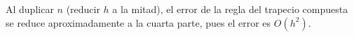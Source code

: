 \documentclass[a4,11pt]{aleph-notas}
\begin{document}
\begin{advertencia}
    Al duplicar $n$ (reducir $h$ a la mitad), el error de la regla del trapecio compuesta se reduce aproximadamente a la cuarta parte, pues el error es $O(h^2)$.
\end{advertencia}

\begin{pscodigo}
\begin{function}[H]
\end{function}
\end{pscodigo}
\end{document}
